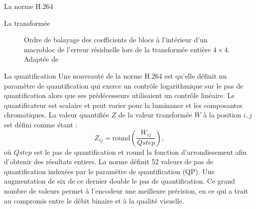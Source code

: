 \begin{chapter}{La norme H.264}
\begin{section}{La transformée}
\begin{figure}
\centering {}
\caption[Ordre de balayage des coefficients de blocs]{Ordre de balayage des
coefficients de blocs à l'intérieur d'un macrobloc de l'erreur résiduelle lors
de la transformée entière $4 \times 4$. \\Adaptée de
\citet[p.~189]{richardson2003}}
\label{fig-Transform}
\end{figure}

\end{section}

\begin{section}{La quantification}
Une nouveauté de la norme H.264 est qu'elle définit un paramètre de
quantification qui exerce un contrôle logarithmique sur le pas de quantification
alors que ses prédécesseurs utilisaient un contrôle linéaire. Le quantificateur
est scalaire et peut varier pour la luminance et les composantes chromatiques.
La valeur quantifiée $Z$ de la valeur transformée $W$ à la position $i,j$ est
défini comme étant :
\begin{equation}
Z_{ij} = \text{round}\left(\frac{W_{ij}}{Qstep}\right),
\end{equation}
où $Qstep$ est le pas de quantification et round la fonction d'arrondissement
afin d'obtenir des résultats entiers. La norme définit 52 valeurs de pas de
quantification indexées par le paramètre de quantification (QP). Une
augmentation de six de ce dernier double le pas de quantification. Ce grand
nombre de valeurs permet à l'encodeur une meilleure précision, en ce qui a trait
au compromis entre le débit binaire et à la qualité visuelle.
\end{section}


\end{chapter}

